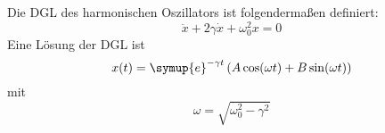 Die DGL des harmonischen Oszillators ist folgendermaßen definiert:
\begin{equation}
  \ddot{x} + 2 \gamma \dot{x} + \omega_{0}^2 x = 0
\end{equation}
Eine Lösung der DGL ist
\begin{equation}
  x(t)= \symup{e}^{- \gamma t} \left
  (A \cos( \omega t) + B \sin( \omega t) \right)
\end{equation}
mit
\begin{equation}
  \omega = \sqrt{\omega_{0}^2 - \gamma^2}
\end{equation}
